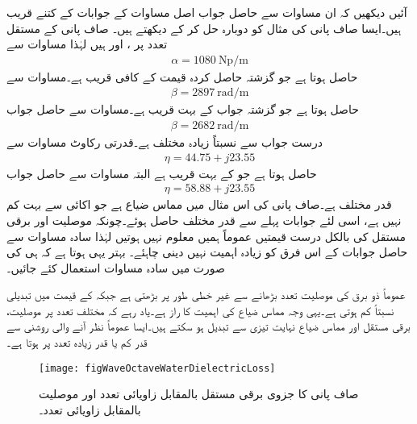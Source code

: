 آئیں دیکھیں کہ ان مساوات سے حاصل جواب اصل مساوات کے جوابات کے کتنے قریب ہیں۔ایسا صاف پانی کی مثال کو دوبارہ حل کر کے دیکھتے ہیں۔ صاف پانی کے مستقل  تعدد پر ،  اور  ہیں لہٰذا  مساوات  سے
\begin{align*}
\alpha =\SI{1080}{\neper \per \meter}
\end{align*}
حاصل ہوتا ہے جو گزشتہ حاصل کردہ قیمت  کے کافی قریب ہے۔مساوات  سے
\begin{align*}
\beta=\SI{2897}{\radian \per \meter}
\end{align*}
حاصل ہوتا ہے جو گزشتہ جواب  کے بہت قریب ہے۔مساوات  سے حاصل جواب
\begin{align*}
\beta=\SI{2682}{\radian \per \meter}
\end{align*}
درست جواب سے نسبتاً زیادہ مختلف ہے۔قدرتی رکاوٹ مساوات  سے
\begin{align*}
\eta=44.75+j 23.55
\end{align*}
حاصل ہوتا ہے جو  کے بہت قریب ہے البتہ مساوات  سے حاصل جواب
\begin{align*}
\eta=58.88+j23.55
\end{align*}
قدر مختلف ہے۔صاف پانی کی اس مثال میں مماس ضیاع  ہے جو اکائی سے بہت کم نہیں ہے، اسی لئے جوابات پہلے سے قدر مختلف حاصل ہوئے۔چونکہ موصلیت اور برقی مستقل کی بالکل درست قیمتیں عموماً ہمیں معلوم نہیں ہوتیں لہٰذا سادہ مساوات سے حاصل جوابات کے اس فرق کو زیادہ اہمیت نہیں دینی چاہئے۔ بہتر یہی ہوتا ہے کہ  ہی کی صورت میں سادہ مساوات استعمال کئے جائیں۔

عموماً ذو برق کی موصلیت تعدد بڑھانے  سے غیر خطی طور پر بڑھتی ہے جبکہ  کے قیمت میں تبدیلی نسبتاً  کم ہوتی ہے۔یہی وجہ مماس ضیاع کی اہمیت کا راز ہے۔یاد رہے کہ مختلف تعدد پر موصلیت، برقی مستقل اور مماس ضیاع نہایت تیزی سے تبدیل ہو سکتے ہیں۔ایسا عموماً نظر آنے والی روشنی سے قدر کم یا قدر زیادہ تعدد پر ہوتا ہے۔ 

\begin{figure}
\centering
\texttt{[image: figWaveOctaveWaterDielectricLoss]}
\caption{صاف پانی کا جزوی برقی مستقل بالمقابل زاویائی تعدد اور موصلیت بالمقابل زاویائی تعدد۔}
\label{شکل_موج_صاف_پانی_تعدد_بالمقابل_برقی_مستقل}
\end{figure}

